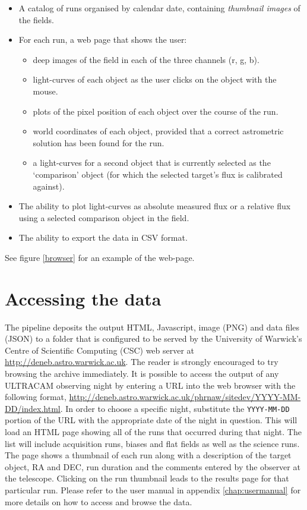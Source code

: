 \begin{itemize}
	\item A catalog of runs organised by calendar date, containing \emph{thumbnail images} of the fields.
	\item For each run, a web page that shows the user:
	\begin{itemize}
		\item deep images of the field in each of the three channels (r, g, b).
		\item light-curves of each object as the user clicks on the object with the mouse. 
		\item plots of the pixel position of each object over the course of the run.
		\item world coordinates of each object, provided that a correct astrometric solution has been found for the run. 
		\item a light-curves for a second object that is currently selected as the `comparison' object (for which the selected target's flux is calibrated against).  
	\end{itemize}
	\item The ability to plot light-curves as absolute measured flux or a relative flux using a selected comparison object in the field. 
	\item The ability to export the data in CSV format.
	
\end{itemize}
See figure \ref{browser} for an example of the web-page. 


  
\section{Accessing the data}
The pipeline deposits the output HTML, Javascript, image (PNG) and data files (JSON) to a folder that is configured to be served by the University of Warwick's Centre of Scientific Computing (CSC) web server at \url{http://deneb.astro.warwick.ac.uk}. The reader is strongly encouraged to try browsing the archive immediately. It is possible to access the output of any ULTRACAM observing night by entering a URL into the web browser with the following format, \url{http://deneb.astro.warwick.ac.uk/phrnaw/sitedev/YYYY-MM-DD/index.html}. In order to choose a specific night, substitute the \texttt{YYYY-MM-DD} portion of the URL with the appropriate date of the night in question. This will load an HTML page showing all of the runs that occurred during that night. The list will include acquisition runs, biases and flat fields as well as the science runs. The page shows a thumbnail of each run along with a description of the target object, RA and DEC, run duration and the comments entered by the observer at the telescope. Clicking on the run thumbnail leads to the results page for that particular run. Please refer to the user manual in appendix \ref{chap:usermanual} for more details on how to access and browse the data.

